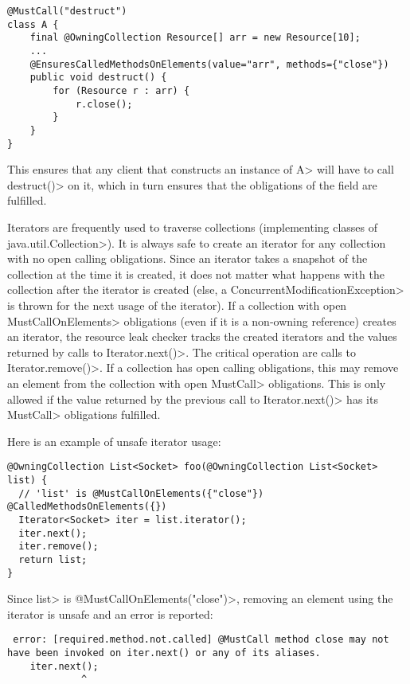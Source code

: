 \begin{verbatim}
@MustCall("destruct")
class A {
    final @OwningCollection Resource[] arr = new Resource[10];
    ...
    @EnsuresCalledMethodsOnElements(value="arr", methods={"close"})
    public void destruct() {
        for (Resource r : arr) {
            r.close();
        }
    }
}
\end{verbatim}

This ensures that any client that constructs an instance of \<A> will have to call \<destruct()> on it, which in turn ensures that the obligations of the field are fulfilled.

Iterators are frequently used to traverse collections (implementing classes of \<java.util.Collection>). It is always safe to create an iterator for any collection with no open calling obligations. Since an iterator takes a snapshot of the collection at the time it is created, it does not matter what happens with the collection after the iterator is created (else, a \<ConcurrentModificationException> is thrown for the next usage of the iterator).
If a collection with open \<MustCallOnElements> obligations (even if it is a non-owning reference) creates an iterator, the resource leak checker tracks the created iterators and the values returned by calls to \<Iterator.next()>. The critical operation are calls to \<Iterator.remove()>. If a collection has open calling obligations, this may remove an element from the collection with open \<MustCall> obligations. This is only allowed if the value returned by the previous call to \<Iterator.next()> has its \<MustCall> obligations fulfilled.

Here is an example of unsafe iterator usage:

\begin{verbatim}
@OwningCollection List<Socket> foo(@OwningCollection List<Socket> list) {
  // 'list' is @MustCallOnElements({"close"}) @CalledMethodsOnElements({})
  Iterator<Socket> iter = list.iterator();
  iter.next();
  iter.remove();
  return list;
}
\end{verbatim}

Since \<list> is \<@MustCallOnElements("close")>, removing an element using the iterator is unsafe and an error is reported:
\begin{verbatim}
 error: [required.method.not.called] @MustCall method close may not have been invoked on iter.next() or any of its aliases.
    iter.next();
             ^
\end{verbatim}

